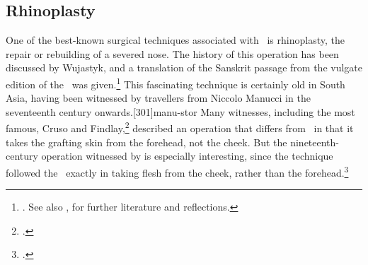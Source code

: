 

\subsection{Rhinoplasty}
\label{sec:rhinoplasty}

One of the best-known surgical techniques associated with \SS\ is rhinoplasty, the
repair or rebuilding of a severed nose. The history of this operation has been
discussed by Wujastyk, and a translation of the Sanskrit passage from the vulgate
edition of the \SS\ was given.\footnote{\cite[67--70, 99--100]{wuja-2003}. See
    also \cite[IB, 327--328, note 186]{meul-hist}, for further literature and
    reflections.} This fascinating technique is certainly old in South Asia, having
    been witnessed by travellers from Niccolo Manucci in the seventeenth century
    onwards.[301]{manu-stor} Many witnesses, including the most famous,
    Cruso and Findlay,\footcite[883, 891\,f.]{cowasjee} described an operation that
    differs from \SS\ in that it takes the grafting skin from the forehead, not the
    cheek.  But the nineteenth-century operation witnessed by \citeauthor{thor-bann}
    is especially interesting, since the technique followed  the \SS\ exactly in
    taking flesh from the cheek, rather than the
    forehead.\footcite[352--353]{thor-bann}

